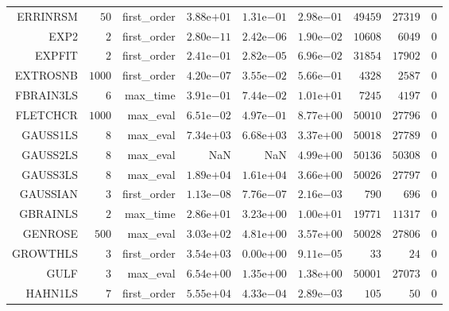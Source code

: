 \begin{longtable}{rrrrrrrrr}
ERRINRSM & \(    50\) & first\_order & \( 3.88\)e\(+01\) & \( 1.31\)e\(-01\) & \( 2.98\)e\(-01\) & \( 49459\) & \( 27319\) & \(     0\) \\
EXP2 & \(     2\) & first\_order & \( 2.80\)e\(-11\) & \( 2.42\)e\(-06\) & \( 1.90\)e\(-02\) & \( 10608\) & \(  6049\) & \(     0\) \\
EXPFIT & \(     2\) & first\_order & \( 2.41\)e\(-01\) & \( 2.82\)e\(-05\) & \( 6.96\)e\(-02\) & \( 31854\) & \( 17902\) & \(     0\) \\
EXTROSNB & \(  1000\) & first\_order & \( 4.20\)e\(-07\) & \( 3.55\)e\(-02\) & \( 5.66\)e\(-01\) & \(  4328\) & \(  2587\) & \(     0\) \\
FBRAIN3LS & \(     6\) & max\_time & \( 3.91\)e\(-01\) & \( 7.44\)e\(-02\) & \( 1.01\)e\(+01\) & \(  7245\) & \(  4197\) & \(     0\) \\
FLETCHCR & \(  1000\) & max\_eval & \( 6.51\)e\(-02\) & \( 4.97\)e\(-01\) & \( 8.77\)e\(+00\) & \( 50010\) & \( 27796\) & \(     0\) \\
GAUSS1LS & \(     8\) & max\_eval & \( 7.34\)e\(+03\) & \( 6.68\)e\(+03\) & \( 3.37\)e\(+00\) & \( 50018\) & \( 27789\) & \(     0\) \\
GAUSS2LS & \(     8\) & max\_eval &       NaN &       NaN & \( 4.99\)e\(+00\) & \( 50136\) & \( 50308\) & \(     0\) \\
GAUSS3LS & \(     8\) & max\_eval & \( 1.89\)e\(+04\) & \( 1.61\)e\(+04\) & \( 3.66\)e\(+00\) & \( 50026\) & \( 27797\) & \(     0\) \\
GAUSSIAN & \(     3\) & first\_order & \( 1.13\)e\(-08\) & \( 7.76\)e\(-07\) & \( 2.16\)e\(-03\) & \(   790\) & \(   696\) & \(     0\) \\
GBRAINLS & \(     2\) & max\_time & \( 2.86\)e\(+01\) & \( 3.23\)e\(+00\) & \( 1.00\)e\(+01\) & \( 19771\) & \( 11317\) & \(     0\) \\
GENROSE & \(   500\) & max\_eval & \( 3.03\)e\(+02\) & \( 4.81\)e\(+00\) & \( 3.57\)e\(+00\) & \( 50028\) & \( 27806\) & \(     0\) \\
GROWTHLS & \(     3\) & first\_order & \( 3.54\)e\(+03\) & \( 0.00\)e\(+00\) & \( 9.11\)e\(-05\) & \(    33\) & \(    24\) & \(     0\) \\
GULF & \(     3\) & max\_eval & \( 6.54\)e\(+00\) & \( 1.35\)e\(+00\) & \( 1.38\)e\(+00\) & \( 50001\) & \( 27073\) & \(     0\) \\
HAHN1LS & \(     7\) & first\_order & \( 5.55\)e\(+04\) & \( 4.33\)e\(-04\) & \( 2.89\)e\(-03\) & \(   105\) & \(    50\) & \(     0\) \\

\end{longtable}
